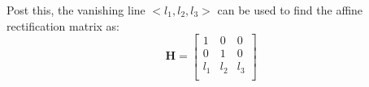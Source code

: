\documentclass[]{article}
\begin{document}
Post this, the vanishing line $<l_1, l_2, l_3>$ can be used to 
find the affine rectification matrix as:
\begin{equation}
  \mathbf{H} = 
  \begin{bmatrix}
  1 & 0 & 0 \\
  0 & 1 & 0 \\
  l_1 & l_2 & l_3 \\
  \end{bmatrix}
\end{equation}
\end{document}
